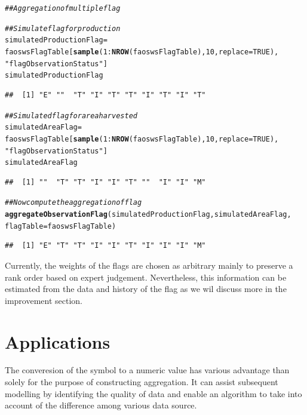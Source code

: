\documentclass[nojss]{jss}\usepackage[]{graphicx}\usepackage[]{color}
\makeatletter
\newcommand{\hlnum}[1]{\textcolor[rgb]{0.686,0.059,0.569}{#1}}%
\newcommand{\hlstr}[1]{\textcolor[rgb]{0.192,0.494,0.8}{#1}}%
\newcommand{\hlcom}[1]{\textcolor[rgb]{0.678,0.584,0.686}{\textit{#1}}}%
\newcommand{\hlopt}[1]{\textcolor[rgb]{0,0,0}{#1}}%
\newcommand{\hlstd}[1]{\textcolor[rgb]{0.345,0.345,0.345}{#1}}%
\newcommand{\hlkwb}[1]{\textcolor[rgb]{0.69,0.353,0.396}{#1}}%
\newcommand{\hlkwc}[1]{\textcolor[rgb]{0.333,0.667,0.333}{#1}}%
\newcommand{\hlkwd}[1]{\textcolor[rgb]{0.737,0.353,0.396}{\textbf{#1}}}%
\newenvironment{kframe}{%
 \def\at@end@of@kframe{}%
 \ifinner\ifhmode%
  \def\at@end@of@kframe{\end{minipage}}%
  \begin{minipage}{\columnwidth}%
 \fi\fi%
 \def\FrameCommand##1{\hskip\@totalleftmargin \hskip-\fboxsep
 \colorbox{shadecolor}{##1}\hskip-\fboxsep
     \hskip-\linewidth \hskip-\@totalleftmargin \hskip\columnwidth}%
 \MakeFramed {\advance\hsize-\width
   \@totalleftmargin\z@ \linewidth\hsize
   \@setminipage}}%
 {\par\unskip\endMakeFramed%
 \at@end@of@kframe}
\newenvironment{knitrout}{}{} %
\makeatother
\begin{document}
\begin{knitrout}
\color{fgcolor}\begin{kframe}
\begin{alltt}
\hlcom{## Aggregation of multiple flag}

\hlcom{## Simulate flag for production}
\hlstd{simulatedProductionFlag} \hlkwb{=}
    \hlstd{faoswsFlagTable[}\hlkwd{sample}\hlstd{(}\hlnum{1}\hlopt{:}\hlkwd{NROW}\hlstd{(faoswsFlagTable),} \hlnum{10}\hlstd{,} \hlkwc{replace} \hlstd{=} \hlnum{TRUE}\hlstd{),}
                    \hlstr{"flagObservationStatus"}\hlstd{]}
\hlstd{simulatedProductionFlag}
\end{alltt}
\begin{verbatim}
##  [1] "E" ""  "T" "I" "T" "T" "I" "T" "I" "T"
\end{verbatim}
\begin{alltt}
\hlcom{## Simulated flag for area harvested}
\hlstd{simulatedAreaFlag} \hlkwb{=}
    \hlstd{faoswsFlagTable[}\hlkwd{sample}\hlstd{(}\hlnum{1}\hlopt{:}\hlkwd{NROW}\hlstd{(faoswsFlagTable),} \hlnum{10}\hlstd{,} \hlkwc{replace} \hlstd{=} \hlnum{TRUE}\hlstd{),}
                    \hlstr{"flagObservationStatus"}\hlstd{]}
\hlstd{simulatedAreaFlag}
\end{alltt}
\begin{verbatim}
##  [1] ""  "T" "T" "I" "I" "T" ""  "I" "I" "M"
\end{verbatim}
\begin{alltt}
\hlcom{## Now compute the aggregation of flag}
\hlkwd{aggregateObservationFlag}\hlstd{(simulatedProductionFlag, simulatedAreaFlag,}
                         \hlkwc{flagTable} \hlstd{= faoswsFlagTable)}
\end{alltt}
\begin{verbatim}
##  [1] "E" "T" "T" "I" "I" "T" "I" "I" "I" "M"
\end{verbatim}
\end{kframe}
\end{knitrout}


Currently, the weights of the flags are chosen as arbitrary mainly to
preserve a rank order based on expert judgement. Nevertheless, this
information can be estimated from the data and history of the flag as
we wil discuss more in the improvement section.



\section{Applications}
The converesion of the symbol to a numeric value has various advantage
than solely for the purpose of constructing aggregation. It can assist
subsequent modelling by identifying the quality of data and enable an
algorithm to take into account of the difference among various data
source.
\end{document}

